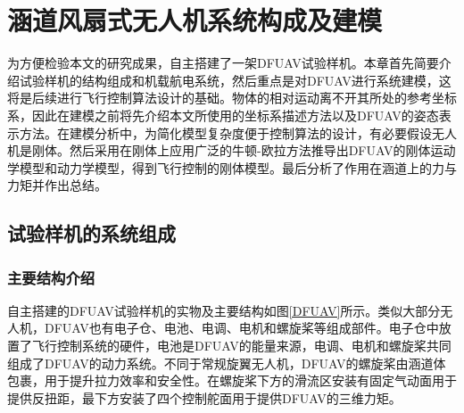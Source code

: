 \chapter{涵道风扇式无人机系统构成及建模}

为方便检验本文的研究成果，自主搭建了一架DFUAV试验样机。本章首先简要介绍试验样机的结构组成和机载航电系统，然后重点是对DFUAV进行系统建模，这将是后续进行飞行控制算法设计的基础。物体的相对运动离不开其所处的参考坐标系，因此在建模之前将先介绍本文所使用的坐标系描述方法以及DFUAV的姿态表示方法。在建模分析中，为简化模型复杂度便于控制算法的设计，有必要假设无人机是刚体。然后采用在刚体上应用广泛的牛顿-欧拉方法推导出DFUAV的刚体运动学模型和动力学模型，得到飞行控制的刚体模型。最后分析了作用在涵道上的力与力矩并作出总结。

\section{试验样机的系统组成}

\subsection{主要结构介绍}

自主搭建的DFUAV试验样机的实物及主要结构如图\ref{DFUAV}所示。类似大部分无人机，DFUAV也有电子仓、电池、电调、电机和螺旋桨等组成部件。电子仓中放置了飞行控制系统的硬件，电池是DFUAV的能量来源，电调、电机和螺旋桨共同组成了DFUAV的动力系统。不同于常规旋翼无人机，DFUAV的螺旋桨由涵道体包裹，用于提升拉力效率和安全性。在螺旋桨下方的滑流区安装有固定气动面用于提供反扭距，最下方安装了四个控制舵面用于提供DFUAV的三维力矩。

